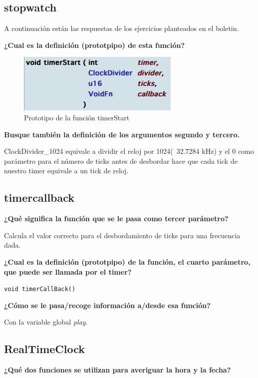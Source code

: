 \documentclass[12pt,english]{article}
\begin{document}
    \subsection{stopwatch}

    A continuación están las respuestas de los ejercicios planteados en el boletin.

    \textbf{¿Cual es la definición (prototpipo) de esta función?}
  
    \begin{figure}[H] 
    \centering
    \includegraphics[scale=0.5]{images/timerStart}
    \caption{Prototipo de la función timerStart}
    \end{figure}

    \textbf{Busque también la definición de los argumentos segundo y tercero.}

    ClockDivider\_1024 equivale a dividir el reloj por 1024(~32.7284 kHz) y el 0 como parámetro para el número de ticks antes de desbordar hace que cada tick de nuestro timer equivale a un tick de reloj.

    \subsection{timercallback}

    \textbf{¿Qué significa la función que se le pasa como tercer parámetro?}

    Calcula el valor correcto para el desbordamiento de ticks para una frecuencia dada.

    \textbf{¿Cual es la definición (prototpipo) de la función, el cuarto parámetro, que puede ser llamada por el timer?}

    \texttt{void timerCallBack()}

    \textbf{¿Cómo se le pasa/recoge información a/desde esa función?}

    Con la variable global \emph{play}.

    \newpage
    \subsection{RealTimeClock}

    \textbf{¿Qué dos funciones se utilizan para averiguar la hora y la fecha?}
\end{document}
